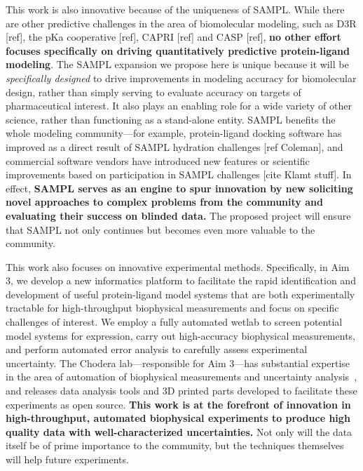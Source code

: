\documentclass[11pt]{article}
\begin{document}
This work is also innovative because of the uniqueness of SAMPL.
While there are other predictive challenges in the area of biomolecular modeling, such as D3R [ref], the pKa cooperative [ref], CAPRI [ref] and CASP [ref],
\textbf{no other effort focuses specifically on driving quantitatively predictive protein-ligand modeling}.
The SAMPL expansion we propose here is unique because it will be \emph{specifically designed} to drive improvements in modeling accuracy for biomolecular design, rather than simply serving to evaluate accuracy on targets of pharmaceutical interest.
It also plays an enabling role for a wide variety of other science, rather than functioning as a stand-alone entity. 
SAMPL benefits the whole modeling community---for example, protein-ligand docking software has improved as a direct result of SAMPL hydration challenges [ref Coleman], and commercial software vendors have introduced new features or scientific improvements based on participation in SAMPL challenges [cite Klamt stuff].
In effect, {\bf SAMPL serves as an engine to spur innovation by new soliciting novel approaches to complex problems from the community and evaluating their success on blinded data.}
The proposed project will ensure that SAMPL not only continues but becomes even more valuable to the community.
 

This work also focuses on innovative experimental methods.
Specifically, in Aim 3, we develop a new informatics platform to facilitate the rapid identification and development of useful protein-ligand model systems that are both experimentally tractable for high-throughput biophysical measurements and focus on specific challenges of interest.
We employ a fully automated wetlab to screen potential model systems for expression, carry out high-accuracy biophysical measurements, and perform automated error analysis to carefully assess experimental uncertainty.
The Chodera lab---responsible for Aim 3---has substantial expertise in the area of automation of biophysical measurements and uncertainty analysis~\cite{Hanson:2015:JournalofComputer-AidedMolecularDesign}, and releases data analysis tools and 3D printed parts developed to facilitate these experiments as open source. 
\textbf{This work is at the forefront of innovation in high-throughput, automated biophysical experiments to produce high quality data with well-characterized uncertainties.} 
Not only will the data itself be of prime importance to the community, but the techniques themselves will help future experiments.
\end{document}
